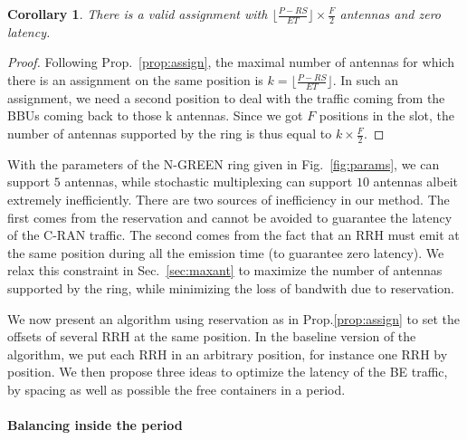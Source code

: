 \documentclass[10pt, conference, letterpaper]{IEEEtran}
\newtheorem{corollary}{Corollary}
\begin{document}
\begin{corollary}
There is a valid assignment with $ \lfloor\frac{P- RS}{ET}\rfloor \times \frac{F}{2}$ antennas and zero latency.
\end{corollary}
\begin{proof}
Following Prop.~\ref{prop:assign}, the maximal number of antennas for which there is an assignment on the same position is $k = \lfloor\frac{P- RS}{ET}\rfloor $.
In such an assignment, we need a second position to deal with the traffic coming from the BBUs coming back to those k antennas. Since we got  $F$ positions in the slot, the number of antennas supported by the ring is thus equal to $k \times \frac{F}{2}$.
\end{proof}

With the parameters of the N-GREEN ring given in Fig.~\ref{fig:params}, we can support $5$ antennas, while stochastic 
multiplexing can support $10$ antennas albeit extremely inefficiently. There are two sources of inefficiency in our method. The first comes from the reservation and cannot be avoided to guarantee the latency of the C-RAN traffic. The second comes from the fact that an RRH must emit at the same position during all the emission time (to guarantee zero latency). We relax this constraint in Sec.~\ref{sec:maxant} to maximize the number of antennas supported by the ring, while minimizing the loss of bandwith due to reservation.

We now present an algorithm using reservation as in Prop.\ref{prop:assign} to set the offsets of several RRH at the same position. In the baseline version of the algorithm, we put each RRH in an arbitrary position, for instance one RRH by position. We then propose three ideas to optimize the latency of the BE traffic, by spacing as well as possible the free containers in a period.

\paragraph{Balancing inside the period}
\end{document}
